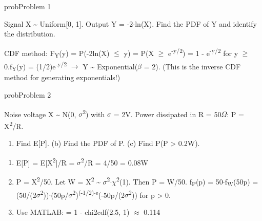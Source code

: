 
\begin{PSbox}[unbreakable]{prob}{Problem 1}

Signal X \textasciitilde{} Uniform[0, 1]. Output Y = -2\ensuremath{\cdot}ln(X). Find the PDF of Y and identify the distribution.

\PSsolution{} CDF method: F\textsubscript{Y}(y) = P(-2ln(X) \ensuremath{\le} y) = P(X \ensuremath{\ge} e\textsuperscript{-y/2}) = 1 - e\textsuperscript{-y/2} for y \ensuremath{\ge} 0.\PSbr{}f\textsubscript{Y}(y) = (1/2)e\textsuperscript{-y/2} \ensuremath{\to} Y \textasciitilde{} Exponential(\ensuremath{\beta} = 2). (This is the inverse CDF method for generating exponentials!)

\end{PSbox}

\begin{PSbox}[unbreakable]{prob}{Problem 2}

Noise voltage X \textasciitilde{} N(0, \ensuremath{\sigma}\textsuperscript{2}) with \ensuremath{\sigma} = 2V. Power dissipated in R = 50\ensuremath{\Omega}: P = X\textsuperscript{2}/R.

\begin{enumerate}
\def\labelenumi{(\alph{enumi})}
\tightlist
\item
  Find E[P]. (b) Find the PDF of P. (c) Find P(P \textgreater{} 0.2W).
\end{enumerate}

\PSsolution{} 

\begin{enumerate}
\def\labelenumi{(\alph{enumi})}
\tightlist
\item
  E[P] = E[X\textsuperscript{2}]/R = \ensuremath{\sigma}\textsuperscript{2}/R = 4/50 = 0.08W
\item
  P = X\textsuperscript{2}/50. Let W = X\textsuperscript{2} \textasciitilde{} \ensuremath{\sigma}\textsuperscript{2}\ensuremath{\cdot}\ensuremath{\chi}\textsuperscript{2}(1). Then P = W/50. f\textsubscript{P}(p) = 50\ensuremath{\cdot}f\textsubscript{W}(50p) = (50/(2\ensuremath{\sigma}\textsuperscript{2}))\ensuremath{\cdot}(50p/\ensuremath{\sigma}\textsuperscript{2})\textsuperscript{(-1/2)\ensuremath{\cdot}e}(-50p/(2\ensuremath{\sigma}\textsuperscript{2})) for p \textgreater{} 0.
\item
  Use MATLAB:  = 1 - chi2cdf(2.5, 1) \ensuremath{\approx} 0.114
\end{enumerate}

\end{PSbox}

